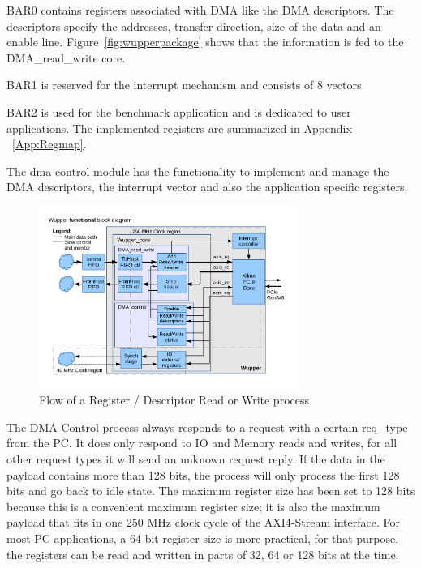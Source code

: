 BAR0 contains registers associated with DMA like the DMA descriptors. The descriptors specify the addresses, transfer direction, size of the data and an enable line. Figure~\ref{fig:wupperpackage} shows that the information is fed to the DMA\_read\_write core.

BAR1 is reserved for the interrupt mechanism and consists of 8 vectors.

BAR2 is used for the benchmark application and is dedicated to user applications. The implemented registers are summarized in Appendix ~\ref{App:Regmap}. 

The dma control module has the functionality to implement and manage the DMA descriptors, the interrupt vector and also the application specific registers.

\begin{figure}[H]
	\centering
	\includegraphics[trim=0mm 2cm 0mm 1cm, width=0.75\textwidth, page=3]{figures/wupper_structure.pdf}
	\caption{Flow of a Register / Descriptor Read or Write process}
	\label{fig:flow_dma_control}
\end{figure}
The DMA Control process always responds to a request with a certain req\_type from the PC. It does only respond to IO and Memory reads and writes, for all other request types it will send an unknown request reply. If the data in the payload contains more than 128 bits, the process will only process the first 128 bits and go back to idle state. The maximum register size has been set to 128 bits because this is a convenient maximum register size; it is also the maximum payload that fits in one 250 MHz clock cycle of the AXI4-Stream interface. For most PC applications, a 64 bit register size is more practical, for that purpose, the registers can be read and written in parts of 32, 64 or 128 bits at the time.

